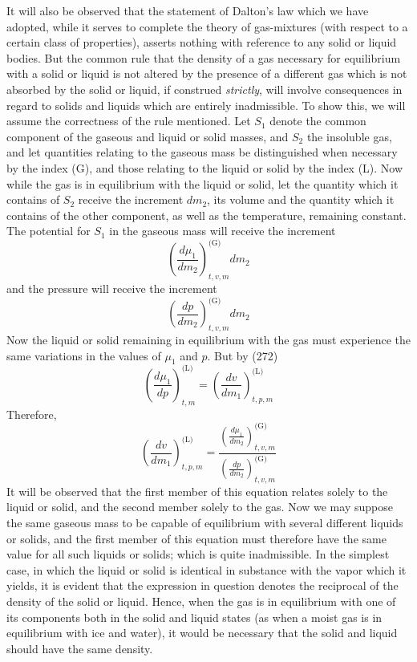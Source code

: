 \documentclass[12pt]{article}
\begin{document}
It will also be observed that the statement of Dalton's law which we have adopted, while it serves to complete the theory of gas-mixtures (with respect to a certain class of properties), asserts nothing with reference to any solid or liquid bodies. But the common rule that the density of a gas necessary for equilibrium with a solid or liquid is not altered by the presence of a different gas which is not absorbed by the solid or liquid, if construed \textit{strictly}, will involve consequences in regard to solids and liquids which are entirely inadmissible. To show this, we will assume the correctness of the rule mentioned. Let $S_1$ denote the common component of the gaseous and liquid or solid masses, and $S_2$ the insoluble gas, and let quantities relating to the gaseous mass be distinguished when necessary by the index (G), and those relating to the liquid or solid by the index (L). Now while the gas is in equilibrium with the liquid or solid, let the quantity which it contains of $S_2$ receive the increment $dm_2$, its volume and the quantity which it contains of the other component, as well as the temperature, remaining constant. The potential for $S_1$ in the gaseous mass will receive the increment
$$ \left( \frac{d\mu_1}{dm_2} \right)_{t,v,m}^{\text{(G)}}  dm_2 $$ 
and the pressure will receive the increment
$$ \left( \frac{d p}{d m_2} \right)_{t,v,m}^{\text{(G)}}  dm_2 $$ 
Now the liquid or solid remaining in equilibrium with the gas must experience the same variations in the values of $\mu_1$ and $p$. But by (272)
$$   \left( \frac{d\mu_1}{d p} \right)_{t,m}^{\text{(L)}}    =
  \left( \frac{d v}{d m_1} \right)_{t,p,m}^{\text{(L)}}     $$
Therefore,          
$$ \left( \frac{d v}{d m_1} \right)_{t,p,m}^{\text{(L)}}  =
\frac{\left( \frac{d\mu_1}{dm_2} \right)_{t,v,m}^{\text{(G)}} }{\left( \frac{d p}{dm_2} \right)_{t,v,m}^{\text{(G)}} }   $$
It will be observed that the first member of this equation relates solely to the liquid or solid, and the second member solely to the gas. Now we may suppose the same gaseous mass to be capable of equilibrium with several different liquids or solids, and the first member of this equation must therefore have the same value for all such liquids or solids; which is quite inadmissible. In the simplest case, in which the liquid or solid is identical in substance with the vapor which it yields, it is evident that the expression in question denotes the reciprocal of the density of the solid or liquid. Hence, when the gas is in equilibrium with one of its components both in the solid and liquid states (as when a moist gas is in equilibrium with ice and water), it would be necessary that the solid and liquid should have the same density.
\end{document}
